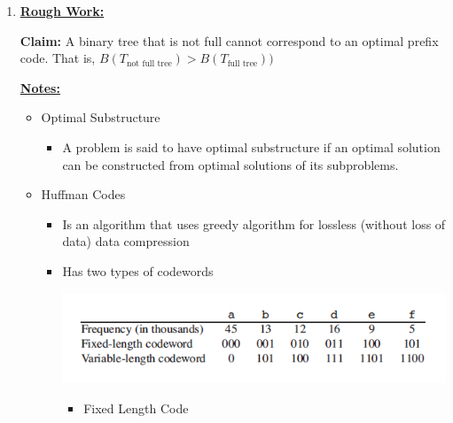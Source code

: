 \documentclass[12pt]{article}
\begin{document}
\begin{enumerate}[1.]
    \item

    \bigskip

    \begin{mdframed}
        \underline{\textbf{Rough Work:}}

        \bigskip

        \textbf{Claim:} A binary tree that is not full cannot correspond to an optimal prefix code.
        That is, $B(T_{\text{not full tree}}) > B(T_{\text{full tree}}))$


    \end{mdframed}

    \underline{\textbf{Notes:}}

    \bigskip

    \begin{itemize}
        \item Optimal Substructure

        \begin{itemize}
            \item A problem is said to have optimal substructure if an optimal solution
            can be constructed from optimal solutions of its subproblems.
        \end{itemize}

        \item Huffman Codes

        \begin{itemize}
            \item Is an algorithm that uses greedy algorithm for lossless (without loss of data) data compression
            \item Has two types of codewords

            \begin{center}
            \includegraphics[width=\linewidth]{images/worksheet_2_solution_11.png}
            \end{center}

            \begin{itemize}
                \item Fixed Length Code


\end{itemize}
\end{itemize}
\end{itemize}
\end{enumerate}
\end{document}
